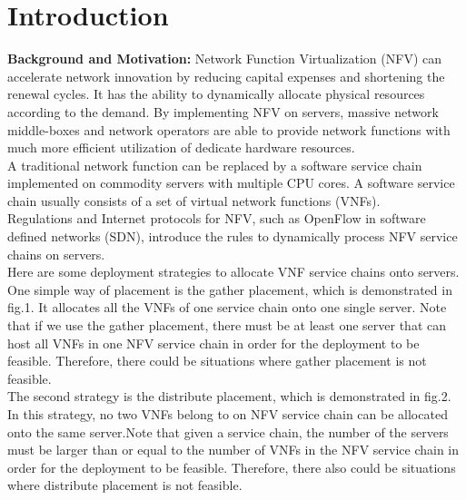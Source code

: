 \documentclass{acmtog}
\begin{document}
\section{Introduction}
\noindent\textbf{Background and Motivation: } Network Function Virtualization (NFV) can accelerate network innovation by reducing capital expenses and shortening the renewal cycles. It has the ability to dynamically allocate physical resources according to the demand. By implementing NFV on servers, massive network middle-boxes and network operators are able to provide network functions with much more efficient utilization of dedicate hardware resources.
\\\indent A traditional network function can be replaced by a software service chain implemented on commodity servers with multiple CPU cores. A software service chain usually consists of a set of virtual network functions (VNFs). 
\\\indent Regulations and Internet protocols for NFV, such as OpenFlow in software defined networks (SDN), introduce the rules to dynamically process NFV service chains on servers.
\\\indent Here are some deployment strategies to allocate VNF service chains onto servers. 
\\\indent One simple way of placement is the gather placement, which is demonstrated in fig.1. It allocates all the VNFs of one service chain onto one single server. Note that if we use the gather placement, there must be at least one server that can host all VNFs in one NFV service chain in order for the deployment to be feasible. Therefore, there could be situations where gather placement is not feasible. 
\\\indent The second strategy is the distribute placement, which is demonstrated in fig.2. In this strategy, no two VNFs belong to on NFV service chain can be allocated onto the same server.Note that given a service chain, the number of the servers must be larger than or equal to the number of VNFs in the NFV service chain in order for the deployment to be feasible. Therefore, there also could be situations where distribute placement is not feasible.
\end{document}
